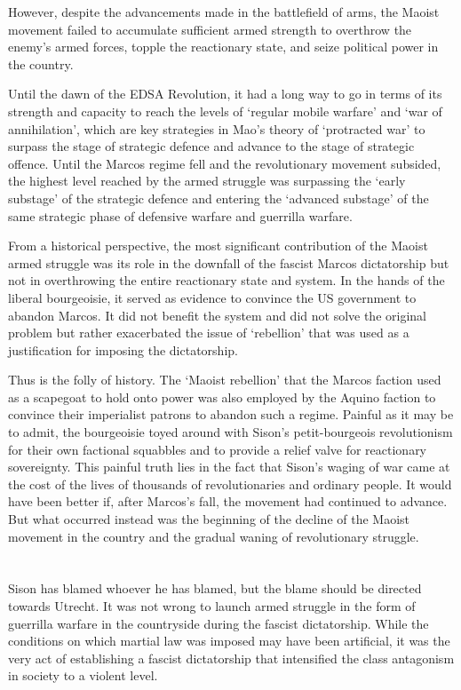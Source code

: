 However,
despite the advancements made in the battlefield of arms, 
the Maoist movement failed to accumulate sufficient armed strength 
to overthrow the enemy's armed forces, 
topple the reactionary state, 
and seize political power in the country.

Until the dawn of the EDSA Revolution, 
it had a long way to go 
in terms of its strength and capacity 
to reach the levels of `regular mobile warfare' and `war of annihilation', 
which are key strategies in Mao's theory of `protracted war'
to surpass the stage of strategic defence 
and advance to the stage of strategic offence. 
Until the Marcos regime fell and the revolutionary movement subsided, 
the highest level reached by the armed struggle 
was surpassing the `early substage' of the strategic defence 
and entering the `advanced substage' 
of the same strategic phase of defensive warfare and guerrilla warfare.

From a historical perspective, 
the most significant contribution 
of the Maoist armed struggle 
was its role in the downfall of the fascist Marcos dictatorship 
but not in overthrowing the entire reactionary state and system. 
In the hands of the liberal bourgeoisie, 
it served as evidence to convince the US government to abandon Marcos. 
It did not benefit the system 
and did not solve the original problem 
but rather exacerbated the issue of `rebellion' 
that was used as a justification for imposing the dictatorship.

Thus is the folly of history.
The `Maoist rebellion' that the Marcos faction used 
as a scapegoat to hold onto power 
was also employed by the Aquino faction 
to convince their imperialist patrons 
to abandon such a regime. 
Painful as it may be to admit, 
the bourgeoisie toyed around with Sison's petit-bourgeois revolutionism 
for their own factional squabbles 
and to provide a relief valve for reactionary sovereignty. 
This painful truth lies in the fact 
that Sison's waging of war 
came at the cost of the lives 
of thousands of revolutionaries and ordinary people. 
It would have been better if, after Marcos's fall, 
the movement had continued to advance. 
But what occurred instead was 
the beginning of the decline 
of the Maoist movement in the country 
and the gradual waning of revolutionary struggle.


\section{}
Sison has blamed whoever he has blamed,
but the blame should be directed towards Utrecht.
It was not wrong to launch armed struggle 
in the form of guerrilla warfare in the countryside 
during the fascist dictatorship. 
While the conditions on which martial law was imposed may have been artificial, 
it was the very act of establishing a fascist dictatorship 
that intensified the class antagonism in society to a violent level.

